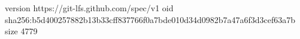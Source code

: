 version https://git-lfs.github.com/spec/v1
oid sha256:b5d400257882b13b33cff837766f0a7bde010d34d0982b7a47a6f3d3cef63a7b
size 4779
